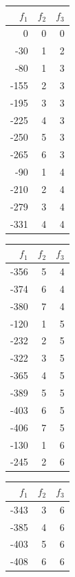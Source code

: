 \documentclass[12pt, a4paper, french, version=last, parskip=half, titlepage]{scrartcl}
\begin{document}
\begin{table}[H]
    \centering
    \begin{tabular}{r r r}
        \toprule
        $f_1$ & $f_2$ & $f_3$ \\
        \midrule
           0 & 0 & 0 \\
         -30 & 1 & 2 \\
         -80 & 1 & 3 \\
        -155 & 2 & 3 \\
        -195 & 3 & 3 \\
        -225 & 4 & 3 \\
        -250 & 5 & 3 \\
        -265 & 6 & 3 \\
         -90 & 1 & 4 \\
        -210 & 2 & 4 \\
        -279 & 3 & 4 \\
        -331 & 4 & 4 \\
        \bottomrule
    \end{tabular}
    \hspace*{1cm}
    \begin{tabular}{r r r}
        \toprule
        $f_1$ & $f_2$ & $f_3$ \\
        \midrule
        -356 & 5 & 4 \\
        -374 & 6 & 4 \\
        -380 & 7 & 4 \\
        -120 & 1 & 5 \\
        -232 & 2 & 5 \\
        -322 & 3 & 5 \\
        -365 & 4 & 5 \\
        -389 & 5 & 5 \\
        -403 & 6 & 5 \\
        -406 & 7 & 5 \\
        -130 & 1 & 6 \\
        -245 & 2 & 6 \\
        \bottomrule
    \end{tabular}
    \hspace*{1cm}
    \begin{tabular}{r r r}
        \toprule
        $f_1$ & $f_2$ & $f_3$ \\
        \midrule
        -343 & 3 & 6 \\
        -385 & 4 & 6 \\
        -403 & 5 & 6 \\
        -408 & 6 & 6 \\

\end{tabular}
\end{table}
\end{document}
